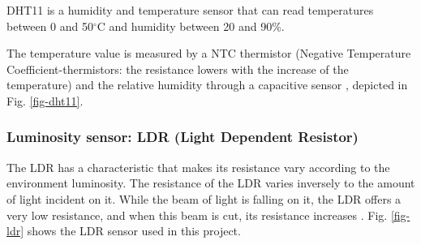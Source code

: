 DHT11 is a humidity and temperature sensor that can read temperatures between 0 and 50$^{\circ}$C and humidity between 20 and 90\%.

The temperature value is measured by a NTC thermistor (Negative Temperature Coefficient-thermistors: the resistance lowers with the increase of the temperature) and the relative humidity through a capacitive sensor \cite{robotics2010dht11}, depicted in Fig. \ref{fig-dht11}.

\subsubsection{Luminosity sensor: LDR (Light Dependent Resistor)}

The LDR has a characteristic that makes its resistance vary according to the environment luminosity. The resistance of the LDR varies inversely to the amount of light incident on it. While the beam of light is falling on it, the LDR offers a very low resistance, and when this beam is cut, its resistance increases \cite{ldr2010manual}. Fig. \ref{fig-ldr} shows the LDR sensor used in this project.


